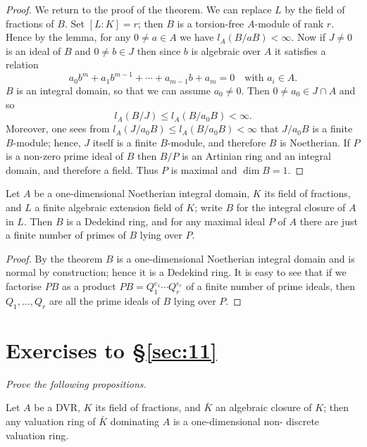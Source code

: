 \begin{proof}
We return to the proof of the theorem. We can replace $L$ by the field of
fractions of $B$. Set $[L:K] = r$; then $B$ is a torsion-free $A$-module of rank $r$.
Hence by the lemma, for any $0 \neq a \in A$ we have $l_A(B/aB) < \infty$. Now if $J \neq 0$ is
an ideal of $B$ and $0 \neq b \in J$ then since $b$ is algebraic over $A$ it satisfies a
relation
\[
  a_0b^m + a_1b^{m-1} + \cdots + a_{m-1}b + a_m = 0 \quad \text{with } a_i \in A.
\]
$B$ is an integral domain, so that we can assume $a_0 \neq 0$. Then $0 \neq a_0 \in J \cap A$
and so
\[
  l_A(B/J) \le l_A(B/a_0B) < \infty.
\]
Moreover, one sees from $l_A(J/a_0B) \le l_A(B/a_0B) < \infty$ that $J/a_0B$
is a finite $B$-module; hence, $J$ itself is a finite $B$-module, and therefore $B$ is
Noetherian. If $P$ is a non-zero prime ideal of $B$ then $B/P$ is an Artinian
ring and an integral domain, and therefore a field. Thus $P$ is maximal and
$\dim B = 1$.
\end{proof}

\begin{corollary*}
Let $A$ be a one-dimensional Noetherian integral domain, $K$ its
field of fractions, and $L$ a finite algebraic extension field of $K$; write $B$ for the
integral closure of $A$ in $L$. Then $B$ is a Dedekind ring, and for any maximal
ideal $P$ of $A$ there are just a finite number of primes of $B$ lying over $P$.
\end{corollary*}

\begin{proof}
By the theorem $B$ is a one-dimensional Noetherian integral domain
and is normal by construction; hence it is a Dedekind ring. It is easy to see
that if we factorise $PB$ as a product $PB = Q_1^{e_1} \cdots Q_r^{e_r}$ of a finite number of
prime ideals, then $Q_1, \ldots, Q_r$ are all the prime ideals of $B$ lying over $P$.
\end{proof}

\section*{Exercises to \S\ref{sec:11}}
\emph{Prove the following propositions.}

\begin{exercise}\label{ex:11.1-ex}
Let $A$ be a DVR, $K$ its field of fractions, and $\bar{K}$ an algebraic closure of $K$;
then any valuation ring of $\bar{K}$ dominating $A$ is a one-dimensional non-
discrete valuation ring.
\end{exercise}

